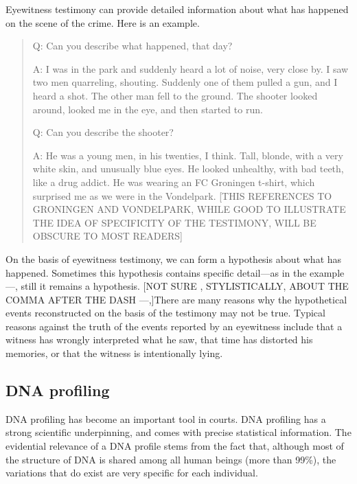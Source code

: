 \documentclass[10pt]{article}
\begin{document}
Eyewitness testimony can provide detailed information about what has happened on the scene of the crime. Here is an example.
%
\begin{quote}
Q: Can you describe what happened, that day?

A: I was in the park and suddenly heard a lot of noise, very close by. I saw two men quarreling, shouting. Suddenly one of them pulled a gun, and I heard a shot. The other man fell to the ground. The shooter looked around, looked me in the eye, and then started to run.

Q: Can you describe the shooter?

A: He was a young men, in his twenties, I think. Tall, blonde, with a very white skin, and unusually blue eyes. He looked unhealthy, with bad teeth, 
like a drug addict. He was wearing an FC Groningen t-shirt, which surprised me as we were in the Vondelpark. [THIS REFERENCES TO GRONINGEN AND VONDELPARK, WHILE GOOD TO ILLUSTRATE THE IDEA OF SPECIFICITY OF THE TESTIMONY, WILL BE OBSCURE TO MOST READERS]
\end{quote}
%
On the basis of eyewitness testimony, we can form a hypothesis about what has happened. Sometimes this hypothesis contains specific detail---as in the example---, still it remains a hypothesis. 
[NOT SURE , STYLISTICALLY,  ABOUT THE COMMA AFTER THE DASH ---,]There are many reasons why the hypothetical events reconstructed on the basis of the testimony may not be true. Typical reasons against the truth of the events reported by an eyewitness include that a witness has wrongly interpreted what he saw, that time has distorted his memories, or that the witness is intentionally lying. 

\subsection{DNA profiling}

DNA profiling has become an important tool in courts. DNA profiling has a strong scientific underpinning, and comes with precise statistical information. The evidential relevance of a DNA profile stems from the fact that, although most of the structure of DNA is shared among all human beings (more than 99\%), the variations that do exist are very specific for each individual. 
\end{document}
